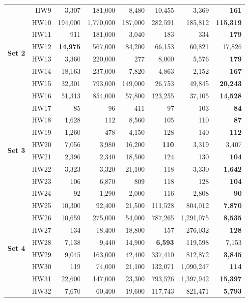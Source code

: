 \documentclass[]{interact}
\begin{document}
\begin{table}[htp]
\begin{tabular}{l|r|r|r|r|r|r|r}
\multirow{8}{*}{\textbf{Set 2}} 
& HW9  & 3,307 & 181,000 & 8,480 & 10,455 & 3,369 & \textbf{161} \\ 
& HW10 & 194,000 & 1,770,000 & 187,000 & 282,591 & 185,812 & \textbf{115,319} \\ 
& HW11 & 911 & 181,000 & 3,040 & {183} & 334 & \textbf{179} \\ 
& HW12 & \textbf{14,975} & 567,000 & 84,200 & 66,153 & 60,821 & {17,826} \\ 
& HW13 & 3,360 & 220,000 & 277 & 8,000 & 5,576 & \textbf{179} \\ 
& HW14 & 18,163 & 237,000 & 7,820 & 4,863 & 2,152 & \textbf{167} \\ 
& HW15 & 32,301 & 793,000 & 149,000 & 26,753 & 49,845 & \textbf{20,243} \\ 
& HW16 & 51,313 & 854,000 & 57,800 & 123,255 & 37,105 & \textbf{14,528} \\ \hline
\multirow{8}{*}{\textbf{Set 3}} 
& HW17 & 85 & 96 & 411 & 97 & 103 & \textbf{84} \\ 
& HW18 & 1,628 & 112 & 8,560 & 105 & 110 & \textbf{87} \\ 
& HW19 & 1,260 & 478 & 4,150 & 128 & 140 & \textbf{112} \\ 
& HW20 & 7,056 & 3,980 & 16,200 & \textbf{110} & 3,319 & 3,407 \\ 
& HW21 & 2,396 & 2,340 & 18,500 & 124 & 130 & \textbf{104} \\ 
& HW22 & 3,323 & {3,320} & 21,100 & 118 & 3,330 & \textbf{1,642} \\ 
& HW23 & 106 & 6,870 & 809 & 118 & 128 & \textbf{104} \\ 
& HW24& 92 & 1,290 & 2,000  & 116 & 2,808 & \textbf{90} \\ \hline
\multirow{8}{*}{\textbf{Set 4}} 
& HW25& 10,300& 92,400& 21,500 & 111,528& 804,012& \textbf{7,870}\\ 
& HW26& 10,659& 275,000& 54,000 & 787,265 & 1,291,075& \textbf{8,535}\\ 
& HW27& 134& 18,400 & 18,800& 157& 276,032& \textbf{128}\\ 
 & HW28  & 7,138& 9,440 & 14,900 & \textbf{6,593}& 119,598& 7,153  \\ 
& HW29 & 9,045 & 163,000 & 42,400& 337,410 & 812,872 & \textbf{3,845}\\ 
& HW30  & 119 & 74,000 & 21,100  & 132,071 & 1,090,247& \textbf{114} \\ 
& HW31& 22,600 & 147,000 & 23,300  & 793,526 & 1,397,942  & \textbf{15,397}  \\
& HW32& 7,670 & 60,400  & 19,600 & 117,743 & 821,471  & \textbf{5,793} \\ \hline
    \end{tabular}
\end{table}
\end{document}
